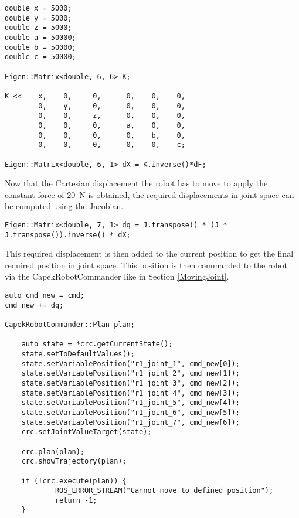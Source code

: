 \documentclass[11pt,a4paper]{report}
\begin{document}
\begin{verbatim}
double x = 5000;
double y = 5000;
double z = 5000;
double a = 50000;
double b = 50000;
double c = 50000;

Eigen::Matrix<double, 6, 6> K;

K <<    x,    0,     0,      0,    0,    0,
        0,    y,     0,      0,    0,    0,
        0,    0,     z,      0,    0,    0,
        0,    0,     0,      a,    0,    0,
        0,    0,     0,      0,    b,    0,
        0,    0,     0,      0,    0,    c;

Eigen::Matrix<double, 6, 1> dX = K.inverse()*dF;
\end{verbatim}
Now that the Cartesian displacement the robot has to move to apply the constant force of 20~N is obtained, the required displacements in joint space can be computed using the Jacobian.
\begin{verbatim}
Eigen::Matrix<double, 7, 1> dq = J.transpose() * (J * J.transpose()).inverse() * dX;
\end{verbatim}
\newpage

This required displacement is then added to the current position to get the final required position in joint space. This position is then commanded to the robot via the CapekRobotCommander like in Section \ref{MovingJoint}.
\begin{verbatim}
auto cmd_new = cmd;
cmd_new += dq;

CapekRobotCommander::Plan plan;

	auto state = *crc.getCurrentState();
	state.setToDefaultValues();
	state.setVariablePosition("r1_joint_1", cmd_new[0]);
	state.setVariablePosition("r1_joint_2", cmd_new[1]);
	state.setVariablePosition("r1_joint_3", cmd_new[2]);
	state.setVariablePosition("r1_joint_4", cmd_new[3]);
	state.setVariablePosition("r1_joint_5", cmd_new[4]);
	state.setVariablePosition("r1_joint_6", cmd_new[5]);
	state.setVariablePosition("r1_joint_7", cmd_new[6]);
	crc.setJointValueTarget(state);

	crc.plan(plan);
	crc.showTrajectory(plan);

	if (!crc.execute(plan)) {
		    ROS_ERROR_STREAM("Cannot move to defined position");
		    return -1;
	}
\end{verbatim}
\newpage
\end{document}
